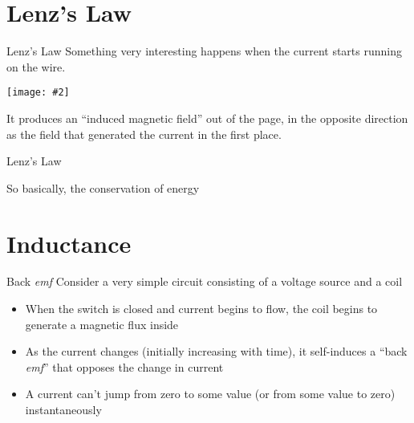 \documentclass[12pt,aspectratio=169]{beamer}
\newcommand{\pic}[2]{\texttt{[image: \#2]}}
\begin{document}
\section{Lenz's Law}

\begin{frame}{Lenz's Law}
  Something very interesting happens when the current starts running on the
  wire.
  \begin{center}
    \pic{.35}{motional-emf-2.png}
  \end{center}
  It produces an ``induced magnetic field'' out of the page, in the opposite
  direction as the field that generated the current in the first place.
\end{frame}



\begin{frame}{Lenz's Law}
  \begin{center}
  \end{center}

  \vspace{.2in}So basically, the conservation of energy
\end{frame}



\section{Inductance}

\begin{frame}{Back \emph{emf}}
  Consider a very simple circuit consisting of a voltage source and a coil
  \begin{center}
  \end{center}
  \begin{itemize}
  \item When the switch is closed and current begins to flow, the coil
    begins to generate a magnetic flux inside
  \item As the current changes (initially increasing with time), it
    self-induces a ``back \emph{emf}'' that opposes the change in current
  \item A current can't jump from zero to some value (or from some value to
    zero) instantaneously
  \end{itemize}
\end{frame}
\end{document}
